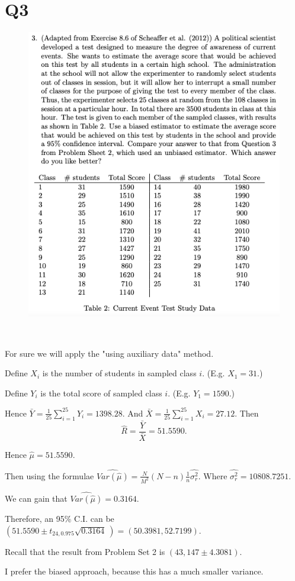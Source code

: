 \documentclass[12pt]{article}%
\begin{document}
\section{Q3}
\begin{figure}[htp]
    \includegraphics[width = 14cm]{img/Q3.png}
\end{figure}

~\ 

For sure we will apply the "using auxiliary data" method.

Define $X_i$ is the number of students in sampled class $i$. (E.g. 
$X_1=31$.)

Define $Y_i$ is the total score of sampled class $i$. (E.g. $Y_1=1590.$)

Hence $\bar{Y}=\frac{1}{25}\sum_{i=1}^{25}Y_i=1398.28.$ And 
$\bar{X}=\frac{1}{25}\sum_{i=1}^{25}X_i=27.12.$ 
Then $$\hat{R}=\frac{\bar{Y}}{\bar{X}}=51.5590.$$

Hence $\hat{\mu}=51.5590.$

Then using the formulae 
$\widehat{Var(\hat{\mu})}=\frac{N}{M^2}(N-n)\frac{1}{n}\hat{\sigma_r^{2}}.$ 
Where $\hat{\sigma_r^{2}}=10808.7251.$

We can gain that $\widehat{Var(\hat{\mu})}=0.3164.$

Therefore, an 95\% C.I. can be $(51.5590 \pm t_{24,0.975}\sqrt{0.3164}~)=(50.3981,52.7199).$

Recall that the result from Problem Set 2 is $(43,147 \pm 4.3081).$

I prefer the biased approach, because this has a much smaller variance.
\end{document}

